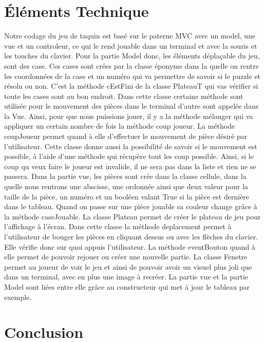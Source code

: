 \documentclass[12pt]{article}
\begin{document}
\section{Éléments Technique}
Notre codage du jeu de taquin est basé sur le paterne MVC avec un model, une vue et un controleur, ce qui le rend jouable dans un terminal et avec la souris et les touches du clavier.
Pour la partie Model donc, les éléments déplaçable du jeu, sont des case. Ces cases sont crées par la classe éponyme dans la quelle on rentre les coordonnées de la case et un numéro qui va permettre de savoir si le puzzle et résolu ou non. C'est la méthode cEstFini de la classe PlateauT qui vas vérifier si toute les cases sont au bon endroit. Dans cette classe certaine méthode sont utilisée pour le mouvement des pièces dans le terminal d'autre sont appelée dans la Vue. Ainsi, pour que nous puissions jouer, il y a la méthode mélanger qui va appliquer un certain nombre de fois la méthode coup joueur. La méthode coupJoueur permet quand à elle d'effectuer le mouvement de pièce désiré par l'utilisateur. Cette classe donne aussi la possibilité de savoir si le mouvement est possible, à l'aide d'une méthode qui récupère tout les coup possible. Ainsi, si le coup qu veux faire le joueur est invalide, il ne sera pas dans la liste et rien ne se passera.
Dans la partie vue, les pièces sont crée dans la classe cellule, dans la quelle nous rentrons une abscisse, une ordonnée ainsi que deux valeur pour la taille de la pièce, un numéro et un booléen valant True si la pièce est dernière dans le tableau. Quand on passe sur une pièce jouable sa couleur change grâce à la méthode caseJouable. La classe Plateau permet de créer le plateau de jeu pour l'affichage à l'écran. Dans cette classe la méthode deplacement permet à l'utilisateur de bouger les pièces en cliquant dessus ou avec les flèches du clavier. Elle vérifie donc sur quoi appuis l'utilisateur. La méthode eventBouton quand à elle permet de pouvoir rejouer ou créer une nouvelle partie. La classe Fenetre permet au joueur de voir le jeu et ainsi de pouvoir avoir un visuel plus joli que dans un terminal, avec en plus une image à recréer.
La partie vue et la partie Model sont liées entre elle grâce au constructeur qui met à jour le tableau par exemple.
\vspace{10pt}


\section*{Conclusion}
\end{document}
